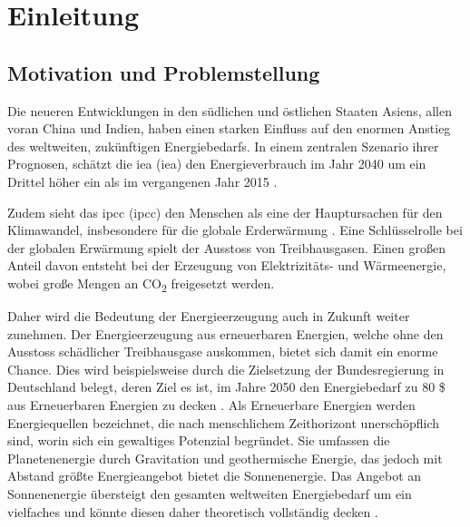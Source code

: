 \renewcommand{\chapterheadstartvskip}{\vspace*{2cm}}

\chapter{Einleitung}
\label{chap:einleitung}
\setcounter{page}{1}
\renewcommand{\chapterheadstartvskip}{\vspace*{-1cm}}


\section{Motivation und Problemstellung}
\label{sec:motivation}

Die neueren Entwicklungen in den südlichen und östlichen Staaten Asiens, allen voran China und Indien, haben einen starken Einfluss auf den enormen Anstieg des weltweiten, zukünftigen Energiebedarfs. In einem zentralen Szenario ihrer Prognosen, schätzt die \acrlong{iea} (\acrshort{iea}) den Energieverbrauch im Jahr 2040 um ein Drittel höher ein als im vergangenen Jahr 2015 \cite[S.~1]{in15}.

Zudem sieht das \acrlong{ipcc} (\acrshort{ipcc}) den Menschen als eine der Hauptursachen für den Klimawandel, insbesondere für die globale Erderwärmung \cite[S.~V]{ip14}. Eine Schlüsselrolle bei der globalen Erwärmung spielt der Ausstoss von Treibhausgasen. Einen großen Anteil davon entsteht bei der Erzeugung von Elektrizitäts- und Wärmeenergie, wobei große Mengen an CO\textsubscript{2} freigesetzt werden\cite[S.~47]{ip14}.

Daher wird die Bedeutung der Energieerzeugung auch in Zukunft weiter zunehmen. Der Energieerzeugung aus erneuerbaren Energien, welche ohne den Ausstoss schädlicher Treibhausgase auskommen, bietet sich damit ein enorme Chance. Dies wird beispielsweise durch die Zielsetzung der Bundesregierung in Deutschland belegt, deren Ziel es ist, im Jahre 2050 den Energiebedarf zu 80 \$ aus Erneuerbaren Energien zu decken \cite[S.~2]{bi15}.
Als Erneuerbare Energien werden Energiequellen bezeichnet, die nach menschlichem Zeithorizont unerschöpflich sind, worin sich ein gewaltiges Potenzial begründet. Sie umfassen die Planetenenergie durch Gravitation und geothermische Energie, das jedoch mit Abstand größte Energieangebot bietet die Sonnenenergie. Das Angebot an Sonnenenergie übersteigt den gesamten weltweiten Energiebedarf um ein vielfaches und könnte diesen daher theoretisch vollständig decken \cite[S.~34f.]{qu11}.


